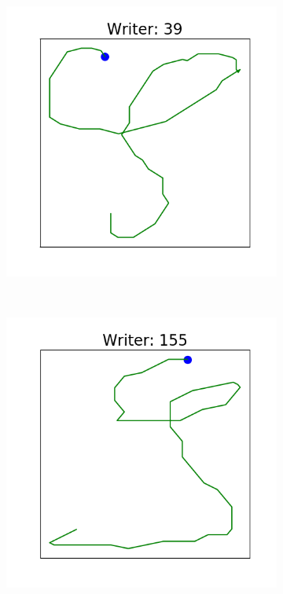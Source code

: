   \begin{figure}[!htbp]
      \centering
      \begin{subfigure}{0.45\textwidth}
          \includegraphics[scale=0.50]{images/framework/S_39.png}
      \end{subfigure}
      ~
      \begin{subfigure}{0.45\textwidth}
          \includegraphics[scale=0.50]{images/framework/S_155.png}

\end{subfigure}
\end{figure}
